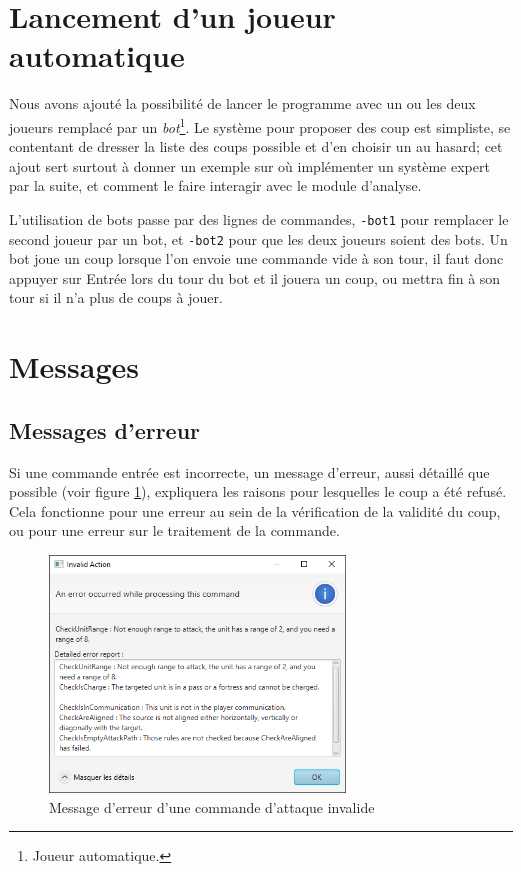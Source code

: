 \documentclass[a4paper]{report}
\begin{document}
\section*{Lancement d'un joueur automatique}
Nous avons ajouté la possibilité de lancer le programme avec un ou les deux joueurs remplacé par un \textit{bot}\footnote{Joueur automatique.}. Le système pour proposer des coup est simpliste, se contentant de dresser la liste des coups possible et d'en choisir un au hasard; cet ajout sert surtout à donner un exemple sur où implémenter un système expert par la suite, et comment le faire interagir avec le module d'analyse.

L'utilisation de bots passe par des lignes de commandes, \texttt{-bot1} pour remplacer le second joueur par un bot, et \texttt{-bot2} pour que les deux joueurs soient des bots.
Un bot joue un coup lorsque l'on envoie une commande vide à son tour, il faut donc appuyer sur Entrée lors du tour du bot et il jouera un coup, ou mettra fin à son tour si il n'a plus de coups à jouer.

\section{Messages}
\subsection*{Messages d'erreur}
Si une commande entrée est incorrecte, un message d'erreur, aussi détaillé que possible (voir figure \ref{fig:ui_log}), expliquera les raisons pour lesquelles le coup a été refusé. Cela fonctionne pour une erreur au sein de la vérification de la validité du coup, ou pour une erreur sur le traitement de la commande.

\begin{figure}[h]
\centering
\includegraphics[width=0.7\textwidth]{interface/log}
\caption{Message d'erreur d'une commande d'attaque invalide}\label{fig:ui_log}
\end{figure}
\end{document}
